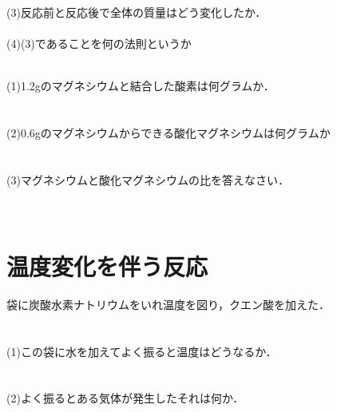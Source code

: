 \documentclass[autodetect-engine,dvi=dvipdfmx,ja=standard,
               a4j,11pt]{bxjsarticle}
\begin{document}
    (3)反応前と反応後で全体の質量はどう変化したか．\\\\

    (4)(3)であることを何の法則というか\\\\
\clearpage

  \begin{figure}[htb]
        \centering
        \vspace{20pt} %
        \caption{}
\end{figure}  
 (1)1.2gのマグネシウムと結合した酸素は何グラムか．\\\\\\

 (2)0.6gのマグネシウムからできる酸化マグネシウムは何グラムか\\\\\\

 (3)マグネシウムと酸化マグネシウムの比を答えなさい．   \\\\\\

 \section{温度変化を伴う反応}
 袋に炭酸水素ナトリウムをいれ温度を図り，クエン酸を加えた．\\\\\\
 
 (1)この袋に水を加えてよく振ると温度はどうなるか．\\\\\\

 (2)よく振るとある気体が発生したそれは何か．\\\\\\
\end{document}
